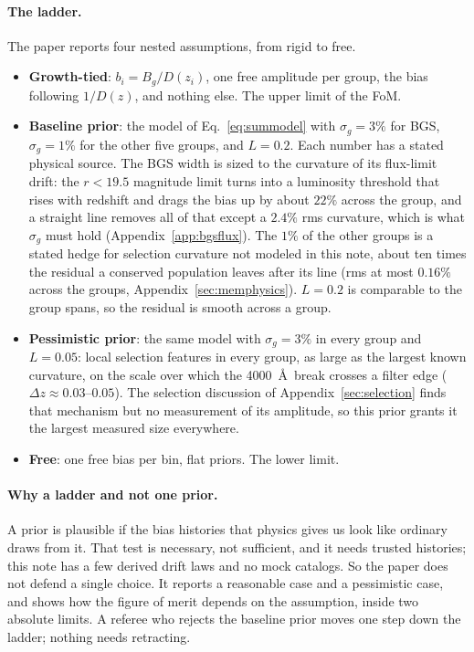 \documentclass[11pt]{article}
\begin{document}
\paragraph{The ladder.}
The paper reports four nested assumptions, from rigid to free.
\begin{itemize}
  \item \textbf{Growth-tied}: $b_i = B_g/D(z_i)$, one free amplitude
    per group, the bias following $1/D(z)$, and nothing else.  The
    upper limit of the FoM.
  \item \textbf{Baseline prior}: the model of Eq.~\eqref{eq:summodel} with
    $\sigma_g = 3\%$ for BGS, $\sigma_g = 1\%$ for the other five
    groups, and $L = 0.2$.  Each number has a stated physical source.
    The BGS width is sized to the curvature of its flux-limit drift:
    the $r < 19.5$ magnitude limit turns into a luminosity threshold
    that rises with redshift and drags the bias up by about $22\%$
    across the group, and a straight line removes all of that except
    a $2.4\%$ rms curvature, which is what $\sigma_g$ must hold
    (Appendix~\ref{app:bgsflux}).  The $1\%$ of the other groups is a
    stated hedge for selection curvature not modeled in this note,
    about ten times the residual a conserved population leaves after
    its line (rms at most $0.16\%$ across the groups,
    Appendix~\ref{sec:memphysics}).
    $L = 0.2$ is comparable to the group spans, so the residual is
    smooth across a group.
  \item \textbf{Pessimistic prior}: the same model with $\sigma_g = 3\%$ in
    every group and $L = 0.05$: local selection features in every
    group, as large as the largest known curvature, on the scale over
    which the 4000~\AA\ break crosses a filter edge
    ($\Delta z \approx 0.03$--$0.05$).  The selection discussion of
    Appendix~\ref{sec:selection} finds that mechanism but no
    measurement of its amplitude, so this prior grants it the largest
    measured size everywhere.
  \item \textbf{Free}: one free bias per bin, flat priors.
    The lower limit.
\end{itemize}

\paragraph{Why a ladder and not one prior.}
A prior is plausible if the bias histories that physics gives us look
like ordinary draws from it.  That test is necessary, not sufficient,
and it needs trusted histories; this note has a few derived drift
laws and no mock catalogs.  So the paper does not defend a single
choice.  It reports a reasonable case and a pessimistic case, and
shows how the figure of merit depends on the assumption, inside two
absolute limits.  A referee who rejects the baseline prior moves one
step down the ladder; nothing needs retracting.
\end{document}
